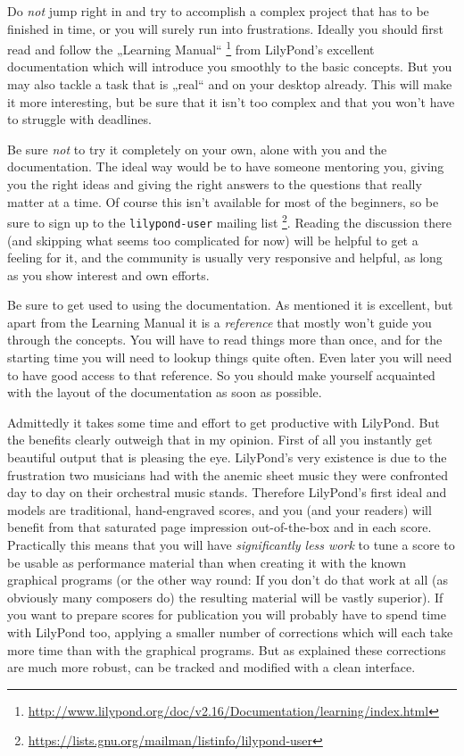\documentclass[DIV=12]{scrreprt}
\begin{document}
Do \emph{not} jump right in and try to accomplish a complex project that has to be finished in time, or you will surely run into frustrations.
Ideally you should first read and follow the „Learning Manual“%
\footnote{\url{http://www.lilypond.org/doc/v2.16/Documentation/learning/index.html}}
from LilyPond's excellent documentation which will introduce you smoothly to the basic concepts.
But you may also tackle a task that is „real“ and on your desktop already.
This will make it more interesting, but be sure that it isn't too complex and that you won't have to struggle with deadlines.

Be sure \emph{not} to try it completely on your own, alone with you and the documentation.
The ideal way would be to have someone mentoring you, giving you the right ideas and giving the right answers to the questions that really matter at a time.
Of course this isn't available for most of the beginners, so be sure to sign up to the \texttt{lilypond-user} mailing list%
\footnote{\url{https://lists.gnu.org/mailman/listinfo/lilypond-user}}.
Reading the discussion there (and skipping what seems too complicated for now) will be helpful to get a feeling for it, and the community is usually very responsive and helpful, as long as you show interest and own efforts.

Be sure to get used to using the documentation.
As mentioned it is excellent, but apart from the Learning Manual it is a \emph{reference} that mostly won't guide you through the concepts.
You will have to read things more than once, and for the starting time you will need to lookup things quite often.
Even later you will need to have good access to that reference.
So you should make yourself acquainted with the layout of the documentation as soon as possible.

\medskip
Admittedly it takes some time and effort to get productive with LilyPond.
But the benefits clearly outweigh that in my opinion.
First of all you instantly get beautiful output that is pleasing the eye.
LilyPond's very existence is due to the frustration two musicians had with the anemic sheet music they were confronted day to day on their orchestral music stands.
Therefore LilyPond's first ideal and models are traditional, hand-engraved scores, and you (and your readers) will benefit from that saturated page impression out-of-the-box and in each score.
Practically this means that you will have \emph{significantly less work} to tune a score to be usable as performance material than when creating it with the known graphical programs (or the other way round: If you don't do that work at all (as obviously many composers do) the resulting material will be vastly superior).
If you want to prepare scores for publication you will probably have to spend time with LilyPond too, applying a smaller number of corrections which will each  take more time than with the graphical programs.
But as explained these corrections are much more robust, can be tracked and modified with a clean interface.
\end{document}
